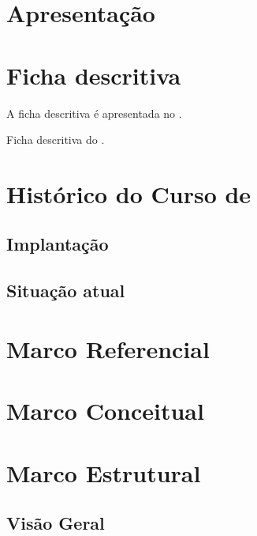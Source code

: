 \documentclass[a3]{ppc-ufscar}
\begin{document}
\chapter{Apresentação}

\ptbrsentenca[201-202]\par
\ptbrparagrafo[1-3]


\chapter{Ficha descritiva}
\ptbrsentenca[18-25]

A ficha descritiva é apresentada no .

\begin{quadro}
    \PPCFichaDescritiva
    \caption{Ficha descritiva do .}
    \label{quadro:ficha-descritiva}
\end{quadro}

\ptbrparagrafo[60]


\chapter{Histórico do Curso de }
\ptbrparagrafo[40]


\section{Implantação}
\ptbrparagrafo[31-35]


\section{Situação atual}
\ptbrparagrafo[38-41]


\chapter{Marco Referencial}
\ptbrparagrafo[10-12]


\chapter{Marco Conceitual}
\ptbrparagrafo[21-24]


\chapter{Marco Estrutural}
\ptbrsentenca[61-62]


\section{Visão Geral}
\ptbrparagrafo[15-16]
\end{document}
